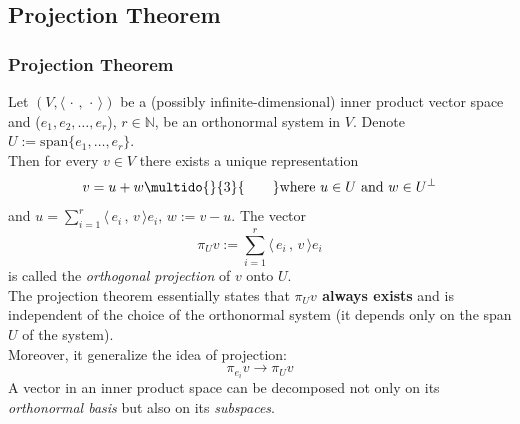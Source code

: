 \documentclass[12pt, t]{beamer}
\renewcommand{\emph}[1]{{\color{Turquoise3}\textsl{#1}}}
\newcommand{\N}{\mathbb{N}}
\newcommand{\myseries}[2]{$#1_1,#1_2,\dots,#1_#2$}
\newcommand{\nullspace}{~\\[15pt]}
\newcommand{\scp}[2]{\langle\,#1\,,\,#2\,\rangle} \newcommand{\scpp}{\langle\,\cdot\,,\,\cdot\,\rangle}
\begin{document}
\subsection{Projection Theorem}
\begin{frame}[allowframebreaks]
    \frametitle{Projection Theorem}
    Let $(V,\scpp)$ be a (possibly infinite-dimensional) inner product vector space and (\myseries{e}{r}), $r\in\N$, be an orthonormal system in $V$. Denote $U:=\text{span}\{e_1,\ldots,e_r\}.$\\
    Then for every $v\in V$ there exists a unique representation
    \begin{equation*}
        v=u+w\multido{}{3}{\qquad}\text{where}~u\in U~\text{and}~w\in U^{\perp}
    \end{equation*}
    and $u=\sum\limits_{i=1}^{r}\scp{e_i}{v}e_i,\,w:=v-u.$
    The vector
    \begin{equation*}
        \pi_Uv:=\sum_{i=1}^{r}\scp{e_i}{v}e_i
    \end{equation*}
    is called the \emph{orthogonal projection} of $v$ onto $U$.\\
    \newpage
    The projection theorem essentially states that \textbf{$\pi_Uv$ always exists} and is independent of the choice of the orthonormal system (it depends only on the span $U$ of the system).
    \nullspace
    Moreover, it generalize the idea of projection:
    $$
        \pi_{e_i}v\rightarrow\pi_Uv
    $$
    A vector in an inner product space can be decomposed not only on its \emph{orthonormal basis} but also on its \emph{subspaces}.
\end{frame}
\end{document}
